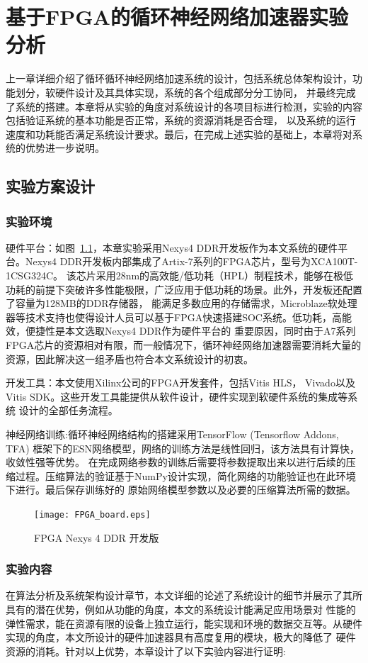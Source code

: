 \chapter{基于FPGA的循环神经网络加速器实验分析}
上一章详细介绍了循环循环神经网络加速系统的设计，包括系统总体架构设计，功能划分，软硬件设计及其具体实现，系统的各个组成部分分工协同，
并最终完成了系统的搭建。本章将从实验的角度对系统设计的各项目标进行检测，实验的内容包括验证系统的基本功能是否正常，系统的资源消耗是否合理，
以及系统的运行速度和功耗能否满足系统设计要求。最后，在完成上述实验的基础上，本章将对系统的优势进一步说明。
\section{实验方案设计}
\subsection{实验环境}
硬件平台：如图~\ref{fig_board}，本章实验采用Nexys4 DDR开发板作为本文系统的硬件平台。Nexys4 DDR开发板内部集成了Artix-7系列的FPGA芯片，型号为XCA100T-1CSG324C。
该芯片采用28nm的高效能/低功耗（HPL）制程技术，能够在极低功耗的前提下突破许多性能极限，广泛应用于低功耗的场景。此外，开发板还配置了容量为128MB的DDR存储器，
能满足多数应用的存储需求，Microblaze软处理器等技术支持也使得设计人员可以基于FPGA快速搭建SOC系统。低功耗，高能效，便捷性是本文选取Nexys4 DDR作为硬件平台的
重要原因，同时由于A7系列FPGA芯片的资源相对有限，而一般情况下，循环神经网络加速器需要消耗大量的资源，因此解决这一组矛盾也符合本文系统设计的初衷。

开发工具：本文使用Xilinx公司的FPGA开发套件，包括Vitis HLS， Vivado以及Vitis SDK。这些开发工具能提供从软件设计，硬件实现到软硬件系统的集成等系统
设计的全部任务流程。

神经网络训练:循环神经网络结构的搭建采用TensorFlow (Tensorflow Addons, TFA) 框架下的ESN网络模型，网络的训练方法是线性回归，该方法具有计算快，收敛性强等优势。
在完成网络参数的训练后需要将参数提取出来以进行后续的压缩过程。压缩算法的验证基于NumPy设计实现，简化网络的功能验证也在此环境下进行。最后保存训练好的
原始网络模型参数以及必要的压缩算法所需的数据。
\begin{figure}
	\centering
	\texttt{[image: FPGA\_board.eps]}
	\caption{FPGA Nexys 4 DDR 开发版}
	\label{fig_board}
\end{figure}
\subsection{实验内容}
在算法分析及系统架构设计章节，本文详细的论述了系统设计的细节并展示了其所具有的潜在优势，例如从功能的角度，本文的系统设计能满足应用场景对
性能的弹性需求，能在资源有限的设备上独立运行，能实现和环境的数据交互等。从硬件实现的角度，本文所设计的硬件加速器具有高度复用的模块，极大的降低了
硬件资源的消耗。针对以上优势，本章设计了以下实验内容进行证明:

